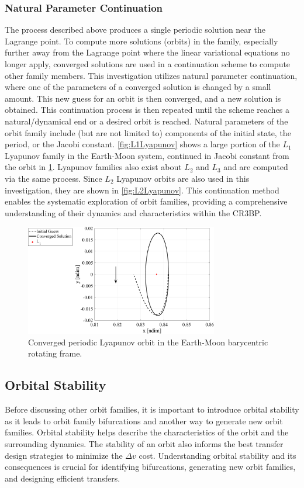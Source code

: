 \subsubsection{Natural Parameter Continuation}
The process described above produces a single periodic solution near the Lagrange point. To compute
more solutions (orbits) in the family, especially further away from the Lagrange point where the linear
variational equations no longer apply, converged solutions are used in a continuation scheme to
compute other family members. This investigation utilizes natural parameter continuation, where one
of the parameters of a converged solution is changed by a small amount. This new guess for an orbit
is then converged, and a new solution is obtained. This continuation process is then repeated until
the scheme reaches a natural/dynamical end or a desired orbit is reached. Natural parameters of the
orbit family include (but are not limited to) components of the initial state, the period, or the
Jacobi constant. \cref{fig:L1Lyapunov} shows a large portion of the $L_{1}$ Lyapunov family in the
Earth-Moon system, continued in Jacobi constant from the orbit in \cref{fig:Lyapunov}. Lyapunov
families also exist about $L_{2}$ and $L_{3}$ and are computed via the same process. Since $L_{2}$
Lyapunov orbits are also used in this investigation, they are shown in \cref{fig:L2Lyapunov}. This
continuation method enables the systematic exploration of orbit families, providing a comprehensive
understanding of their dynamics and characteristics within the CR3BP.

\begin{figure}[H]
    \centering
    \includegraphics[width=0.75\textwidth]{figures/Lyapunov.pdf}
    \caption{Converged periodic Lyapunov orbit in the Earth-Moon barycentric rotating frame.}
    \label{fig:Lyapunov}
\end{figure}

\subsection{Orbital Stability}
Before discussing other orbit families, it is important to introduce orbital stability as it leads
to orbit family bifurcations and another way to generate new orbit families. Orbital stability
helps describe the characteristics of the orbit and the surrounding dynamics. The stability of an
orbit also informs the best transfer design strategies to minimize the $\Delta v$ cost.
Understanding orbital stability and its consequences is crucial for identifying bifurcations,
generating new orbit families, and designing efficient transfers.

